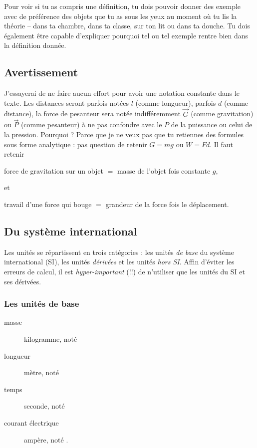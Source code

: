 \documentclass[a4paper,12pt]{book}
\theoremstyle{mes_exemples}	\newtheorem{exemple}[numtho]{Exemple}
\theoremstyle{mes_tho}
\newcommand{\fP}{\overrightarrow{P}}
\newcommand{\fG}{\overrightarrow{G}}
\begin{document}
Pour voir si tu as compris une définition, tu dois pouvoir donner des exemple avec de préférence des objets que tu as sous les yeux au moment où tu lis la théorie -- dans ta chambre, dans ta classe, sur ton lit ou dans ta douche. Tu dois également être capable d'expliquer pourquoi tel ou tel exemple rentre bien dans la définition donnée.

\subsection{Avertissement}

J'essayerai de ne faire aucun effort pour avoir une notation constante dans le texte. Les distances seront parfois notées $l$ (comme longueur), parfois $d$ (comme distance), la force de pesanteur sera notée indifféremment $ \fG$ (comme gravitation) ou $\fP$ (comme pesanteur) à ne pas confondre avec le $P$ de la puissance ou celui de la pression. Pourquoi ? Parce que je ne veux pas que tu retiennes des formules sous forme analytique : pas question de retenir $G=mg$ ou $W=Fd$. Il faut retenir
\begin{center}
force de gravitation sur un objet $=$ masse de l'objet fois constante $g$,
\end{center}
et
\begin{center}
travail d'une force qui bouge $=$ grandeur de la force fois le déplacement.
\end{center}


\subsection{Du système international}

Les unités se répartissent en trois catégories : les unités \emph{de base} du système international (SI), les unités \emph{dérivées} et les unités \emph{hors SI}. Affin d'éviter les erreurs de calcul, il est \emph{hyper-important} (!!) de n'utiliser que les unités du SI et ses dérivées.


\subsubsection{Les unités de base}
\begin{description}
\item[masse] kilogramme, noté \kilogram 
\item[longueur] mètre, noté \meter
\item[temps] seconde, noté \second
\item[courant électrique] ampère, noté \ampere.
\end{description}
\end{document}
